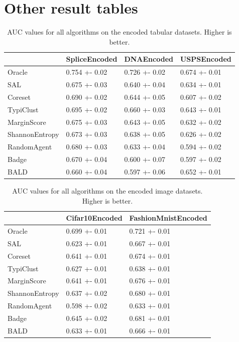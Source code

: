 \documentclass[]{article}
\begin{document}
\section{Other result tables}
\begin{table}[H]
	\begin{tabular}{l|lll}
		& SpliceEncoded & DNAEncoded    & USPSEncoded   \\
		\hline
		Oracle          & 0.754 +- 0.02 & 0.726 +- 0.02 & 0.674 +- 0.01 \\
		SAL & 0.675 +- 0.03 & 0.640 +- 0.04 & 0.634 +- 0.01 \\
		Coreset & 0.690 +- 0.02 & 0.644 +- 0.05 & 0.607 +- 0.02 \\
		TypiClust       & 0.695 +- 0.02 & 0.660 +- 0.03 & 0.643 +- 0.01 \\
		MarginScore     & 0.675 +- 0.03 & 0.643 +- 0.05 & 0.632 +- 0.02 \\
		ShannonEntropy  & 0.673 +- 0.03 & 0.638 +- 0.05 & 0.626 +- 0.02 \\
		RandomAgent     & 0.680 +- 0.03 & 0.633 +- 0.04 & 0.594 +- 0.02 \\
		Badge           & 0.670 +- 0.04 & 0.600 +- 0.07 & 0.597 +- 0.02 \\
		BALD            & 0.660 +- 0.04 & 0.597 +- 0.06 & 0.652 +- 0.01
	\end{tabular}
	\caption{AUC values for all algorithms on the encoded tabular datasets. Higher is better.}
\end{table}
%
\begin{table}[H]
	\begin{tabular}{l|ll}
		& Cifar10Encoded & FashionMnistEncoded \\
		\hline
		Oracle          & 0.699 +- 0.01  & 0.721 +- 0.01       \\
		SAL & 0.623 +- 0.01  & 0.667 +- 0.01       \\
		Coreset & 0.641 +- 0.01  & 0.674 +- 0.01       \\
		TypiClust       & 0.627 +- 0.01  & 0.638 +- 0.01       \\
		MarginScore     & 0.641 +- 0.01  & 0.676 +- 0.01       \\
		ShannonEntropy  & 0.637 +- 0.02  & 0.680 +- 0.01       \\
		RandomAgent     & 0.598 +- 0.02  & 0.633 +- 0.01       \\
		Badge           & 0.645 +- 0.02  & 0.681 +- 0.01       \\
		BALD            & 0.633 +- 0.01  & 0.666 +- 0.01      
	\end{tabular}
	\caption{AUC values for all algorithms on the encoded image datasets. Higher is better.}
\end{table}
\end{document}
